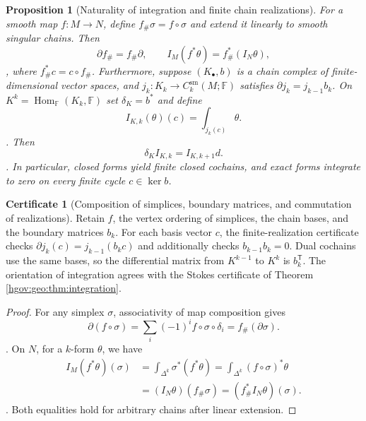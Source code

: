 \documentclass[12pt,a4paper,openany,notitlepage]{report}
\theoremstyle{plain}
\newtheorem{proposition}[theorem]{Proposition}
\theoremstyle{definition}
\newtheorem*{certificate}{Certificate}
\theoremstyle{remark}
\begin{document}
\begin{CJK*}
\begin{proposition} [Naturality of integration and finite chain realizations]
\label{exp:geo:prop:integration-naturality}
For a smooth map $f:M\to N$, define
$f_\#\sigma=f\circ\sigma$
and extend it linearly to smooth singular chains. Then
\[
\partial f_\#=f_\#\partial,
\qquad
I_M(f^*\theta)=f_\#^*(I_N\theta),
\],
where $f_\#^*c=c\circ f_\#$. Furthermore, suppose $(K_\bullet,b)$ is a chain complex of finite-dimensional vector spaces, and $j_k:K_k\to C_k^{\mathrm{sm}}(M;\mathbb F)$ satisfies
$\partial j_k=j_{k-1}b_k$.
On $K^k=\operatorname{Hom}_{\mathbb F}(K_k,\mathbb F)$ set
$\delta_K=b^*$
and define
\[
I_{K,k}(\theta)(c)=\int_{j_k(c)}\theta.
\].
Then
\[
\delta_K I_{K,k}=I_{K,k+1}d.
\].
In particular, closed forms yield finite closed cochains, and exact forms integrate to zero on every finite cycle $c\in\ker b$.
\end{proposition}
\begin{certificate} [Composition of simplices, boundary matrices, and commutation of realizations]
Retain $f$, the vertex ordering of simplices, the chain bases, and the boundary matrices $b_k$. For each basis vector $c$, the finite-realization certificate checks $\partial j_k(c)=j_{k-1}(b_kc)$ and additionally checks $b_{k-1}b_k=0$. Dual cochains use the same bases, so the differential matrix from $K^{k-1}$ to $K^k$ is $b_k^{\mathsf T}$. The orientation of integration agrees with the Stokes certificate of Theorem ~ \ref{hgov:geo:thm:integration}.
\end{certificate}
\begin{proof}
For any simplex $\sigma$, associativity of map composition gives
\[
\partial(f\circ\sigma)
=\sum_i(-1)^if\circ\sigma\circ\delta_i
=f_\#(\partial\sigma).
\].
On $N$, for a $k$-form $\theta$, we have
\[
\begin{aligned}
I_M(f^*\theta)(\sigma)
&=\int_{\Delta^k}\sigma^*(f^*\theta)
=\int_{\Delta^k}(f\circ\sigma)^*\theta\\
&=(I_N\theta)(f_\#\sigma)
=(f_\#^*I_N\theta)(\sigma).
\end{aligned}
\].
Both equalities hold for arbitrary chains after linear extension.


\end{proof}
\end{CJK*}
\end{document}
